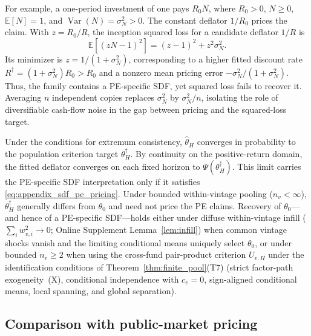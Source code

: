 For example, a one-period investment of one pays $R_0N$, where $R_0>0$, $N\ge0$, $\mathbb E[N]=1$, and $\operatorname{Var}(N)=\sigma_N^2>0$. The constant deflator $1/R_0$ prices the claim. With $z=R_0/R$, the inception squared loss for a candidate deflator $1/R$ is
\[
 \mathbb E[(zN-1)^2]=(z-1)^2+z^2\sigma_N^2.
\]
Its minimizer is $z=1/(1+\sigma_N^2)$, corresponding to a higher fitted discount rate $R^\dagger=(1+\sigma_N^2)R_0>R_0$ and a nonzero mean pricing error $-\sigma_N^2/(1+\sigma_N^2)$. Thus, the family contains a PE-specific SDF, yet squared loss fails to recover it. Averaging $n$ independent copies replaces $\sigma_N^2$ by $\sigma_N^2/n$, isolating the role of diversifiable cash-flow noise in the gap between pricing and the squared-loss target.

Under the conditions for extremum consistency, $\hat\theta_H$ converges in probability to the population criterion target $\theta_H^\dagger$. By continuity on the positive-return domain, the fitted deflator converges on each fixed horizon to $\Psi(\theta_H^\dagger)$. This limit carries the PE-specific SDF interpretation only if it satisfies \eqref{eq:appendix_sdf_pe_pricing}. Under bounded within-vintage pooling ($n_v<\infty$), $\theta_H^\dagger$ generally differs from $\theta_0$ and need not price the PE claims. Recovery of $\theta_0$---and hence of a PE-specific SDF---holds either under diffuse within-vintage infill ($\sum_i w_{v,i}^2 \to 0$; Online Supplement Lemma~\ref{lem:infill}) when common vintage shocks vanish and the limiting conditional means uniquely select $\theta_0$, or under bounded $n_v\ge 2$ when using the cross-fund pair-product criterion $U_{v,H}$ under the identification conditions of Theorem~\ref{thm:finite_pool}(T7) (strict factor-path exogeneity~(X), conditional independence with $c_v = 0$, sign-aligned conditional means, local spanning, and global separation).

\subsection{Comparison with public-market pricing}

